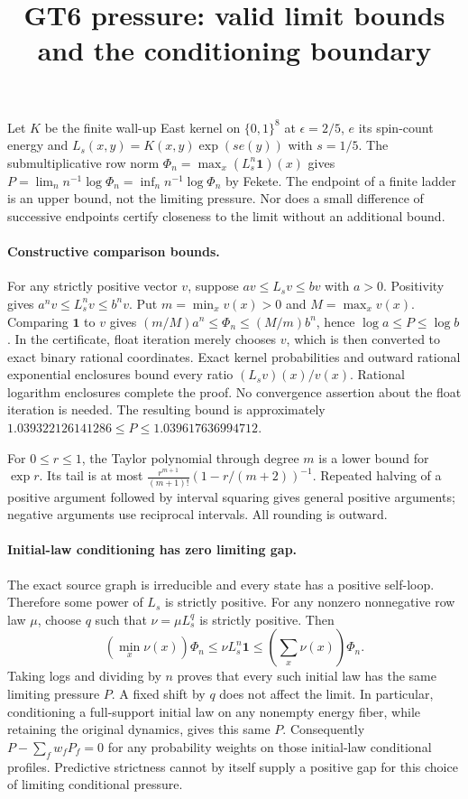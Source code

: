 \documentclass{article}
\begin{document}
\title{GT6 pressure: valid limit bounds and the conditioning boundary}
\author{}\date{}\maketitle

Let $K$ be the finite wall-up East kernel on $\{0,1\}^8$ at $\epsilon=2/5$,
$e$ its spin-count energy and $L_s(x,y)=K(x,y)\exp(se(y))$ with $s=1/5$.
The submultiplicative row norm
$\Phi_n=\max_x(L_s^n\mathbf1)(x)$ gives
$P=\lim_n n^{-1}\log\Phi_n=\inf_n n^{-1}\log\Phi_n$ by Fekete.
The endpoint of a finite ladder is an upper bound, not the limiting pressure.
Nor does a small difference of successive endpoints certify closeness to the
limit without an additional bound.

\paragraph{Constructive comparison bounds.}
For any strictly positive vector $v$, suppose $av\leq L_sv\leq bv$ with
$a>0$. Positivity gives $a^nv\leq L_s^nv\leq b^nv$. Put
$m=\min_xv(x)>0$ and $M=\max_xv(x)$. Comparing $\mathbf1$ to $v$ gives
$(m/M)a^n\leq\Phi_n\leq(M/m)b^n$, hence $\log a\leq P\leq\log b$.
In the certificate, float iteration merely chooses $v$, which is then
converted to exact binary rational coordinates. Exact kernel probabilities
and outward rational exponential enclosures bound every ratio
$(L_sv)(x)/v(x)$. Rational logarithm enclosures complete the proof. No
convergence assertion about the float iteration is needed. The resulting
bound is approximately $1.039322126141286\leq P\leq1.039617636994712$.

For $0\leq r\leq1$, the Taylor polynomial through degree $m$ is a lower
bound for $\exp r$. Its tail is at most
$\frac{r^{m+1}}{(m+1)!}(1-r/(m+2))^{-1}$. Repeated halving of a positive
argument followed by interval squaring gives general positive arguments;
negative arguments use reciprocal intervals. All rounding is outward.

\paragraph{Initial-law conditioning has zero limiting gap.}
The exact source graph is irreducible and every state has a positive
self-loop. Therefore some power of $L_s$ is strictly positive. For any
nonzero nonnegative row law $\mu$, choose $q$ such that $\nu=\mu L_s^q$
is strictly positive. Then
\[
 (\min_x\nu(x))\Phi_n\leq\nu L_s^n\mathbf1
 \leq(\sum_x\nu(x))\Phi_n.
\]
Taking logs and dividing by $n$ proves that every such initial law has the
same limiting pressure $P$. A fixed shift by $q$ does not affect the limit.
In particular, conditioning a full-support initial law on any nonempty
energy fiber, while retaining the original dynamics, gives this same $P$.
Consequently $P-\sum_f w_fP_f=0$ for any probability weights on those
initial-law conditional profiles. Predictive strictness cannot by itself
supply a positive gap for this choice of limiting conditional pressure.
\end{document}

